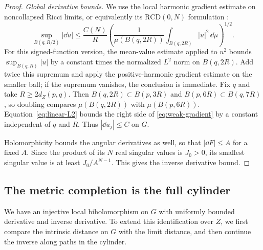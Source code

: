 \begin{proof}
\emph{Global derivative bounds.}
We use the local harmonic gradient estimate on noncollapsed
Ricci limits, or equivalently its $\mathrm{RCD}(0,N)$ formulation
\cite[Theorem~1.2 and Theorem~4.1(a)]{HuaKellXia}:
\begin{equation}\label{eq:weak-gradient}
 \sup_{B(q,R/2)}|\dd u|
 \le \frac{C(N)}{R}
       \left(\frac{1}{\mu(B(q,2R))}
                    \int_{B(q,2R)}|u|^2\,\dd\mu\right)^{1/2}.
\end{equation}
For this signed-function version, the mean-value estimate applied
to $u^2$ bounds $\sup_{B(q,R)}|u|$ by a constant times the
normalized $L^2$ norm on $B(q,2R)$. Add twice this supremum and
apply the positive-harmonic gradient estimate on the smaller ball;
if the supremum vanishes, the conclusion is immediate. Fix $q$ and
take $R\ge 2d_Z(p,q)$. Then
$B(q,2R)\subset B(p,3R)$ and $B(p,6R)\subset B(q,7R)$,
so doubling compares $\mu(B(q,2R))$ with $\mu(B(p,6R))$.
Equation~\eqref{eq:linear-L2} bounds the right side of
\eqref{eq:weak-gradient} by a constant independent of $q$ and $R$.
Thus $|\dd u_j|\le C$ on $G$.

Holomorphicity bounds the angular derivatives as well, so that
$|\dd F|\le A$ for a fixed $A$. Since the product of its $N$ real
singular values is $J_0>0$, its smallest singular value is at least
$J_0/A^{N-1}$. This gives the inverse derivative bound.
\end{proof}

\subsection{The metric completion is the full cylinder}

We have an injective local biholomorphism on $G$ with uniformly bounded
derivative and inverse derivative.  To extend this identification over
$Z$, we first compare the intrinsic distance on $G$ with the limit
distance, and then continue the inverse along paths in the cylinder.

